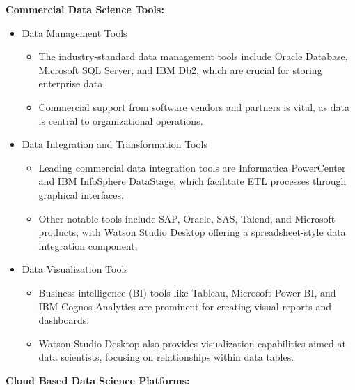 \documentclass[12pt]{report} %
\begin{document}
		\noindent \textbf{Commercial Data Science Tools:}
		
		\begin{itemize}
			\item Data Management Tools
			\begin{itemize}
				\item  The industry-standard data management tools include Oracle Database, Microsoft SQL Server, and IBM Db2, which are crucial for storing enterprise data.
				\item Commercial support from software vendors and partners is vital, as data is central to organizational operations.
			\end{itemize}
			\item Data Integration and Transformation Tools
			\begin{itemize}
				\item  Leading commercial data integration tools are Informatica PowerCenter and IBM InfoSphere DataStage, which facilitate ETL processes through graphical interfaces.
				\item Other notable tools include SAP, Oracle, SAS, Talend, and Microsoft products, with Watson Studio Desktop offering a spreadsheet-style data integration component.
			\end{itemize}
			\item Data Visualization Tools
			\begin{itemize}
				\item  Business intelligence (BI) tools like Tableau, Microsoft Power BI, and IBM Cognos Analytics are prominent for creating visual reports and dashboards.
				\item Watson Studio Desktop also provides visualization capabilities aimed at data scientists, focusing on relationships within data tables.
			\end{itemize}			
		\end{itemize}
	
	\newpage
	
		\noindent \textbf{Cloud Based Data Science Platforms:}
	
\end{document}
